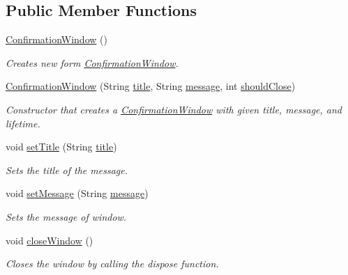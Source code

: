 \subsection*{Public Member Functions}
\begin{DoxyCompactItemize}
\item 
\hyperlink{classCommonUIElements_1_1ConfirmationWindow_ae99ae36a3b34af52c80bfe2d404788c5}{Confirmation\+Window} ()
\begin{DoxyCompactList}\small\item\em Creates new form \hyperlink{classCommonUIElements_1_1ConfirmationWindow}{Confirmation\+Window}. \end{DoxyCompactList}\item 
\hyperlink{classCommonUIElements_1_1ConfirmationWindow_af0187cf6484465c088b4b1d49a345027}{Confirmation\+Window} (String \hyperlink{classCommonUIElements_1_1ConfirmationWindow_af03f991bc2c55d19a2507a54a20b6ab6}{title}, String \hyperlink{classCommonUIElements_1_1ConfirmationWindow_a5161ae2950ae7a12018c207a7d0ab1d5}{message}, int \hyperlink{classCommonUIElements_1_1ConfirmationWindow_ae9ba201fcec4a227a32aa9dd18f8224f}{should\+Close})
\begin{DoxyCompactList}\small\item\em Constructor that creates a \hyperlink{classCommonUIElements_1_1ConfirmationWindow}{Confirmation\+Window} with given title, message, and lifetime. \end{DoxyCompactList}\item 
void \hyperlink{classCommonUIElements_1_1ConfirmationWindow_a12e20697cbb522da6af910468f0df7bd}{set\+Title} (String \hyperlink{classCommonUIElements_1_1ConfirmationWindow_af03f991bc2c55d19a2507a54a20b6ab6}{title})
\begin{DoxyCompactList}\small\item\em Sets the title of the message. \end{DoxyCompactList}\item 
void \hyperlink{classCommonUIElements_1_1ConfirmationWindow_a3abf955dd0d33285a512f113800c77c5}{set\+Message} (String \hyperlink{classCommonUIElements_1_1ConfirmationWindow_a5161ae2950ae7a12018c207a7d0ab1d5}{message})
\begin{DoxyCompactList}\small\item\em Sets the message of window. \end{DoxyCompactList}\item 
void \hyperlink{classCommonUIElements_1_1ConfirmationWindow_ab3b4932646ddf67d77e6de3033d07176}{close\+Window} ()
\begin{DoxyCompactList}\small\item\em Closes the window by calling the dispose function. \end{DoxyCompactList}\end{DoxyCompactItemize}
